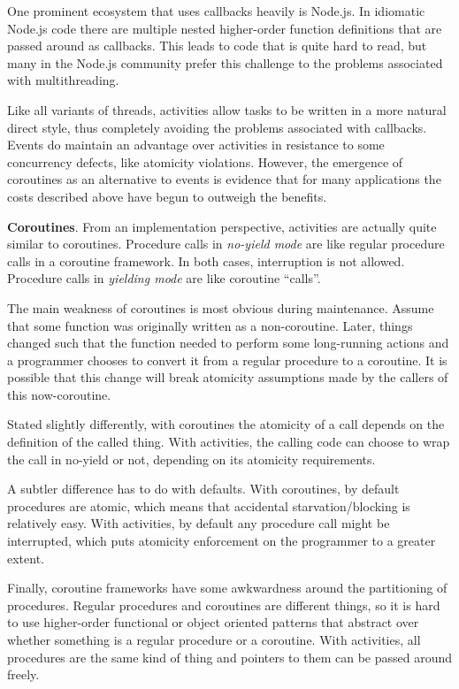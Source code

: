 \documentclass[9pt,preprint]{sigplanconf}
\begin{document}
One prominent ecosystem that uses callbacks heavily is Node.js.
In idiomatic Node.js code there are multiple nested higher-order function definitions that are passed around as callbacks.
This leads to code that is quite hard to read, but many in the Node.js community prefer this challenge to the problems associated with multithreading.

Like all variants of threads, activities allow tasks to be written in a more natural direct style, thus completely avoiding the problems associated with callbacks.
Events do maintain an advantage over activities in resistance to some concurrency defects, like atomicity violations.
However, the emergence of coroutines as an alternative to events is evidence that for many applications the costs described above have begun to outweigh the benefits.

\textbf{Coroutines}.
From an implementation perspective, activities are actually quite similar to coroutines.
Procedure calls in \emph{no-yield mode} are like regular procedure calls in a coroutine framework.
In both cases, interruption is not allowed.
Procedure calls in \emph{yielding mode} are like coroutine ``calls''.

The main weakness of coroutines is most obvious during maintenance.
Assume that some function was originally written as a non-coroutine.
Later, things changed such that the function needed to perform some long-running actions and a programmer chooses to convert it from a regular procedure to a coroutine.
It is possible that this change will break atomicity assumptions made by the callers of this now-coroutine.

Stated slightly differently, with coroutines the atomicity of a call depends on the definition of the called thing.
With activities, the calling code can choose to wrap the call in no-yield or not, depending on its atomicity requirements.

A subtler difference has to do with defaults.
With coroutines, by default procedures are atomic, which means that accidental starvation/blocking is relatively easy.
With activities, by default any procedure call might be interrupted, which puts atomicity enforcement on the programmer to a greater extent.

Finally, coroutine frameworks have some awkwardness around the partitioning of procedures.
Regular procedures and coroutines are different things, so it is hard to use higher-order functional or object oriented patterns that abstract over whether something is a regular procedure or a coroutine.
With activities, all procedures are the same kind of thing and pointers to them can be passed around freely.
\end{document}
